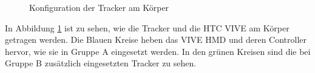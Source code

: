\begin{figure}[h]
  \caption[Konfiguration der Tracker am Körper]{Konfiguration der Tracker am Körper}
  \label{fig:trackerCircle}
\end{figure}

In Abbildung \ref{fig:trackerCircle} ist zu sehen, wie die Tracker und die HTC VIVE am Körper getragen werden. Die Blauen Kreise heben das VIVE HMD und deren Controller hervor, wie sie in Gruppe A eingesetzt werden. In den grünen Kreisen sind die bei Gruppe B zusätzlich eingesetzten Tracker zu sehen.


